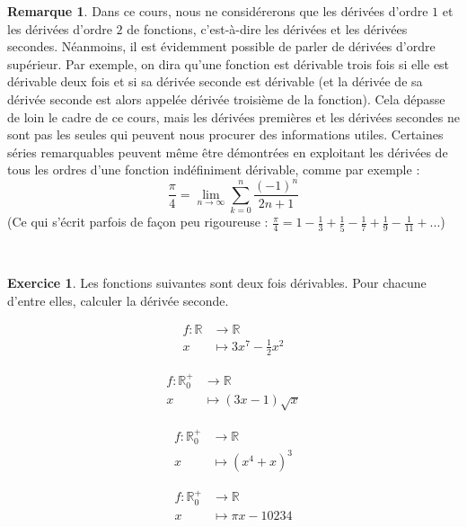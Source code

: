 \documentclass[a4paper,fontsize=13pt]{scrreprt}
\theoremstyle{plain}
\theoremstyle{definition}
\newtheorem{rema}[subsection]{Remarque}
\newtheorem{exo}[subsection]{Exercice}
\newcommand{\rr}{\mathbb{R}}
\newenvironment{benumerate}[1][0pt]{\begin{enumerate}\renewcommand{\makelabel}[1]{\textbf{##1}}\setlength{\itemsep}{#1}}{\end{enumerate}}
\begin{document}
\begin{rema}
Dans ce cours, nous ne considérerons que les dérivées d'ordre $1$ et les dérivées d'ordre $2$ de fonctions, c'est-à-dire les dérivées et les dérivées secondes. Néanmoins, il est évidemment possible de parler de dérivées d'ordre supérieur. Par exemple, on dira qu'une fonction est dérivable trois fois si elle est dérivable deux fois et si sa dérivée seconde est dérivable (et la dérivée de sa dérivée seconde est alors appelée dérivée troisième de la fonction). Cela dépasse de loin le cadre de ce cours, mais les dérivées premières et les dérivées secondes ne sont pas les seules qui peuvent nous procurer des informations utiles. Certaines séries remarquables peuvent même être démontrées en exploitant les dérivées de tous les ordres d'une fonction indéfiniment dérivable, comme par exemple :
$$\frac{\pi}{4} = \lim_{n \to \infty} \sum\limits_{k=0}^{n} \frac{(-1)^n}{2n+1}$$
(Ce qui s'écrit parfois de façon peu rigoureuse : $\frac{\pi}{4} = 1 - \frac{1}{3} + \frac{1}{5} - \frac{1}{7} + \frac{1}{9} - \frac{1}{11} + ...$)
\end{rema}~\\
\begin{exo}
Les fonctions suivantes sont deux fois dérivables. Pour chacune d'entre elles, calculer la dérivée seconde.
\begin{benumerate}
\begin{multicols}{2}
\item \begin{align*}
	f : \rr &\to \rr \\
	x &\mapsto 3x^7-\frac{1}{2}x^2
	\end{align*}
\item \begin{align*}
	f : {\rr}_{0}^{+} &\to \rr \\
	x &\mapsto (3x-1)\sqrt{x}
	\end{align*}
\item \begin{align*}
	f : {\rr}_{0}^{+} &\to \rr \\
	x &\mapsto (x^4+x)^3
	\end{align*}
\item \begin{align*}
	f : {\rr}_{0}^{+} &\to \rr \\
	x &\mapsto \pi x - 10234
	\end{align*}
\end{multicols}
\end{benumerate}
	\end{exo}\newpage
\end{document}
